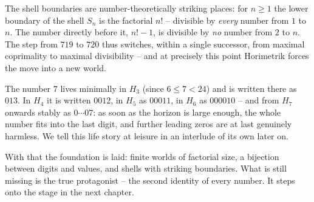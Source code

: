 The shell boundaries are number-theoretically striking places: for
$n\ge1$ the lower boundary of the shell $S_n$ is the factorial $n!$
-- divisible by \emph{every} number from $1$ to $n$. The number
directly before it, $n!-1$, is divisible by \emph{no} number from
$2$ to $n$. The step from $719$ to $720$ thus switches, within a
single successor, from maximal coprimality to maximal divisibility
-- and at precisely this point Horimetrik forces the move into a
new world.

\begin{beispiel}
The number $7$ lives minimally in $H_3$ (since $6\le7<24$) and is
written there as $013$. In $H_4$ it is written $0012$, in $H_5$ as
$00011$, in $H_6$ as $000010$ -- and from $H_7$ onwards stably as
$0\cdots07$: as soon as the horizon is large enough, the whole
number fits into the last digit, and further leading zeros are at
last genuinely harmless. We tell this life story at leisure in an
interlude of its own later on.
\end{beispiel}

With that the foundation is laid: finite worlds of factorial size,
a bijection between digits and values, and shells with striking
boundaries. What is still missing is the true protagonist -- the
second identity of every number. It steps onto the stage in the
next chapter.
